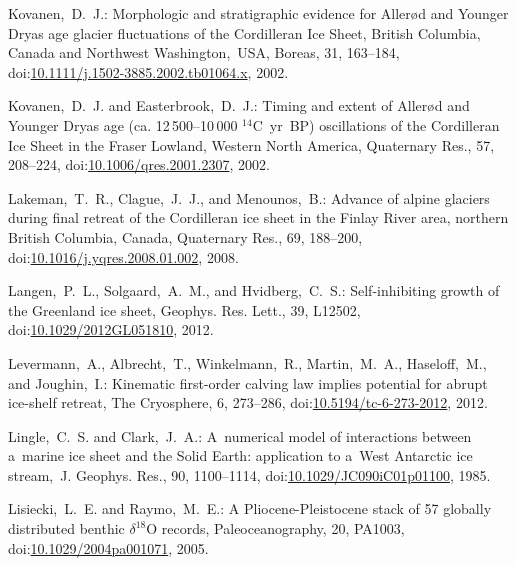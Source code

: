 \documentclass[tc, manuscript]{copernicus}
\begin{document}
\begin{thebibliography}{114}
Kovanen,~D.~J.: Morphologic and stratigraphic evidence for Aller{\o}d and Younger Dryas age glacier fluctuations of the Cordilleran Ice Sheet, British Columbia, Canada and Northwest Washington,~USA, Boreas, 31, 163--184,
doi:\href{http://dx.doi.org/10.1111/j.1502-3885.2002.tb01064.x}{10.1111/j.1502-3885.2002.tb01064.x}, 2002.


Kovanen,~D.~J. and Easterbrook,~D.~J.: Timing and extent of Aller{\o}d and Younger Dryas age (ca. 12\,500--10\,000 $^{14}$C~yr~BP) oscillations of the Cordilleran Ice Sheet in the Fraser Lowland, Western North America, Quaternary Res., 57, 208--224,
doi:\href{http://dx.doi.org/10.1006/qres.2001.2307}{10.1006/qres.2001.2307}, 2002.


Lakeman,~T.~R., Clague,~J.~J., and Menounos,~B.: Advance of alpine glaciers during final retreat of the Cordilleran ice sheet in the Finlay River area, northern British Columbia, Canada, Quaternary Res., 69, 188--200,
doi:\href{http://dx.doi.org/10.1016/j.yqres.2008.01.002}{10.1016/j.yqres.2008.01.002}, 2008.


Langen,~P.~L., Solgaard,~A.~M., and Hvidberg,~C.~S.: Self-inhibiting growth of the Greenland ice sheet, Geophys. Res. Lett., 39, L12502,
doi:\href{http://dx.doi.org/10.1029/2012GL051810}{10.1029/2012GL051810}, 2012.


 Levermann,~A., Albrecht,~T., Winkelmann,~R., Martin,~M.~A., Haseloff,~M., and Joughin,~I.: Kinematic first-order calving law implies potential for  abrupt ice-shelf retreat, The Cryosphere, 6, 273--286,
doi:\href{http://dx.doi.org/10.5194/tc-6-273-2012}{10.5194/tc-6-273-2012}, 2012.


Lingle,~C.~S. and Clark,~J.~A.: A~numerical model of interactions between a~marine ice sheet and the Solid Earth: application to a~West Antarctic ice stream,~J. Geophys. Res., 90, 1100--1114,
doi:\href{http://dx.doi.org/10.1029/JC090iC01p01100}{10.1029/JC090iC01p01100}, 1985.


Lisiecki,~L.~E. and Raymo,~M.~E.: A Pliocene-Pleistocene stack of 57 globally distributed benthic $\delta^{18}$O records, Paleoceanography, 20, PA1003,
doi:\href{http://dx.doi.org/10.1029/2004pa001071}{10.1029/2004pa001071}, 2005.



\end{thebibliography}
\end{document}
